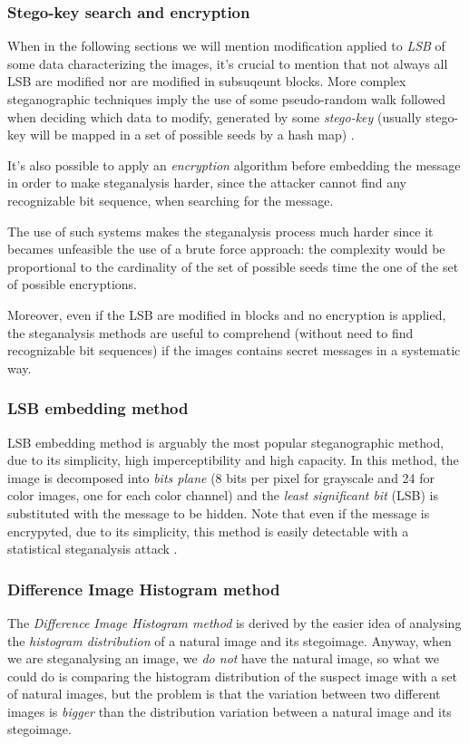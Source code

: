 \documentclass[../../main.tex]{subfiles}
\begin{document}
    \subsubsection{Stego-key search and encryption}
    When in the following sections we will mention modification applied to
    \emph{LSB} of some data characterizing the images, it's crucial to mention
    that not always all LSB are modified nor are modified in subsuqeunt blocks.
    More complex steganographic techniques imply the use of some pseudo-random
    walk followed when deciding which data to modify, generated by some
    \emph{stego-key} (usually stego-key will be mapped in a set of possible
    seeds by a hash map) \cite{stego-key}.

    It's also possible to apply an \emph{encryption} algorithm before embedding
    the message in order to make steganalysis harder, since the attacker cannot
    find any recognizable bit sequence, when searching for the message.

    The use of such systems makes the steganalysis process much harder since it
    becames unfeasible the use of a brute force approach: the complexity would
    be proportional to the cardinality of the set of possible seeds time the
    one of the set of possible encryptions.

    Moreover, even if the LSB are modified in blocks and no encryption is
    applied, the steganalysis methods are useful to comprehend (without need to
    find recognizable bit sequences) if the images contains secret messages in
    a systematic way.


    \subsubsection{LSB embedding method}
    LSB embedding method is arguably the most popular steganographic method, due
    to its simplicity, high imperceptibility and high capacity.
    In this method, the image is decomposed into \emph{bits plane} (8 bits per
    pixel for grayscale and 24 for color images, one for each color channel)
    and the \emph{least significant bit} (LSB) is substituted with the message
    to be hidden.
    Note that even if the message is encrypyted, due to its simplicity, this
    method is easily detectable with a statistical steganalysis attack
    \cite{techniques-data-hiding}.
    

    \subsubsection{Difference Image Histogram method}
    The \emph{Difference Image Histogram method} is derived by the easier idea
    of analysing the \emph{histogram distribution} of a natural image and its
    stegoimage. Anyway, when we are steganalysing an image, we \emph{do not}
    have the natural image, so what we could do is comparing the histogram
    distribution of the suspect image with a set of natural images, but the
    problem is that the variation between two different images is \emph{bigger}
    than the distribution variation between a natural image and its stegoimage.
    \cite{methodology-steganalysis-images}
\end{document}
